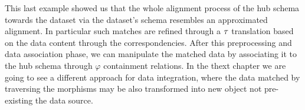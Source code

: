 This last example showed us that the whole alignment  process of the hub schema towards the dataset via the dataset's schema resembles an approximated alignment. In particular such matches are refined through a $\ttransl$ translation  based on the data content  through the correspondencies.%
After this preprocessing and data association phase, we can manipulate the matched data by associating it to the hub schema through $\varphi$ containment relations. In the thext chapter we are going to see a different approach for data integration, where the data matched by traversing the morphisms may be also transformed into new object not pre-existing the data source.